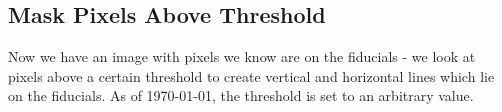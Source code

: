 \documentclass[10pt]{scrartcl}
\begin{document}
    \subsection{Mask Pixels Above Threshold} %
    \label{sub:mask_pixels_above_threshold}
    Now we have an image with pixels we know are on the fiducials - we look at pixels above a certain threshold to create vertical and horizontal lines which lie on the fiducials. As of \today, the threshold is set to an arbitrary value. 

    \begin{figure}[!ht]
    \end{figure}

\end{document}
